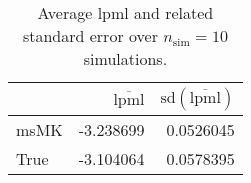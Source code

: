\begin{table}[H]

\caption{Average lpml and related standard error over $n_{\text{sim}} = 10$ simulations.}
\centering
\begin{tabular}[t]{lrr}
\toprule
  & $\overbar{\text{lpml}}$ & $\text{sd}(\overbar{\text{lpml}})$\\
\midrule
msMK & -3.238699 & 0.0526045\\
True & -3.104064 & 0.0578395\\
\bottomrule
\end{tabular}
\end{table}